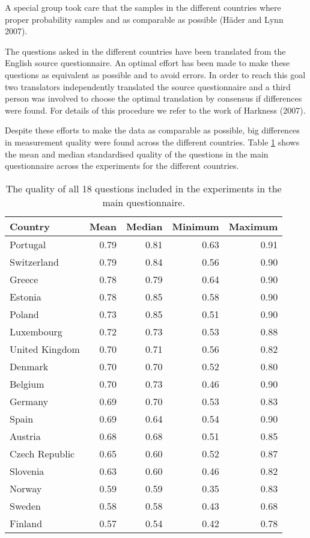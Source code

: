 \documentclass[a4paper,12pt]{article}
\begin{document}
A special group took care that the samples in the different countries where proper probability samples and as comparable as possible (H\"{a}der and Lynn 2007). 

The questions asked in the different countries have been translated from the English source questionnaire. An optimal effort has been made to make these questions as equivalent as possible and to avoid errors. In order to reach this goal two translators independently translated the source questionnaire and a third person was involved to choose the optimal translation by consensus if differences were found. For details of this procedure we refer to the work of Harkness (2007).

	 Despite these efforts to make the data as comparable as possible, big differences in measurement quality were found across the different countries.  Table \ref{tab:countries} shows the mean and median standardised quality of the questions in the main questionnaire across the experiments for the different countries.

\begin{table}[hbt]\centering\caption{The quality of all 18 questions included in the experiments in the main questionnaire.\label{tab:countries}}
\begin{tabular}{lrrrr}
\hline
Country&Mean&Median&Minimum&Maximum\\\hline
Portugal&0.79&0.81&0.63&0.91\\
Switzerland&0.79&0.84&0.56&0.90\\
Greece&0.78&0.79&0.64&0.90\\
Estonia&0.78&0.85&0.58&0.90\\
Poland&0.73&0.85&0.51&0.90\\
Luxembourg&0.72&0.73&0.53&0.88\\
United Kingdom&0.70&0.71&0.56&0.82\\
Denmark&0.70&0.70&0.52&0.80\\
Belgium&0.70&0.73&0.46&0.90\\
Germany&0.69&0.70&0.53&0.83\\
Spain&0.69&0.64&0.54&0.90\\
Austria&0.68&0.68&0.51&0.85\\
Czech Republic&0.65&0.60&0.52&0.87\\
Slovenia&0.63&0.60&0.46&0.82\\
Norway&0.59&0.59&0.35&0.83\\
Sweden&0.58&0.58&0.43&0.68\\
Finland&0.57&0.54&0.42&0.78\\
	\hline
\end{tabular}
\end{table}
\end{document}
